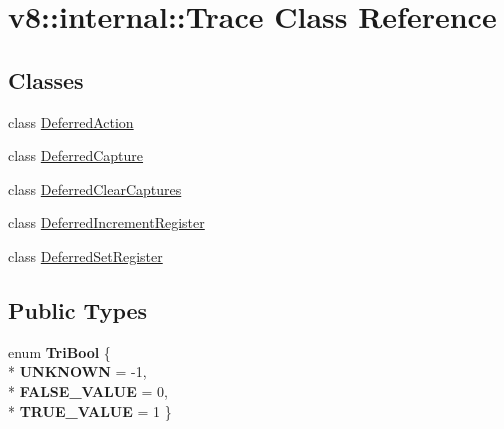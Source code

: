 \hypertarget{classv8_1_1internal_1_1_trace}{}\section{v8\+:\+:internal\+:\+:Trace Class Reference}
\label{classv8_1_1internal_1_1_trace}
\subsection*{Classes}
\begin{DoxyCompactItemize}
\item 
class \hyperlink{classv8_1_1internal_1_1_trace_1_1_deferred_action}{Deferred\+Action}
\item 
class \hyperlink{classv8_1_1internal_1_1_trace_1_1_deferred_capture}{Deferred\+Capture}
\item 
class \hyperlink{classv8_1_1internal_1_1_trace_1_1_deferred_clear_captures}{Deferred\+Clear\+Captures}
\item 
class \hyperlink{classv8_1_1internal_1_1_trace_1_1_deferred_increment_register}{Deferred\+Increment\+Register}
\item 
class \hyperlink{classv8_1_1internal_1_1_trace_1_1_deferred_set_register}{Deferred\+Set\+Register}
\end{DoxyCompactItemize}
\subsection*{Public Types}
\begin{DoxyCompactItemize}
\item 
enum {\bfseries Tri\+Bool} \{ \\*
{\bfseries U\+N\+K\+N\+O\+WN} = -\/1, 
\\*
{\bfseries F\+A\+L\+S\+E\+\_\+\+V\+A\+L\+UE} = 0, 
\\*
{\bfseries T\+R\+U\+E\+\_\+\+V\+A\+L\+UE} = 1
 \}\hypertarget{classv8_1_1internal_1_1_trace_a91598610521e048135cda64a1be64b99}{}\label{classv8_1_1internal_1_1_trace_a91598610521e048135cda64a1be64b99}

\end{DoxyCompactItemize}
